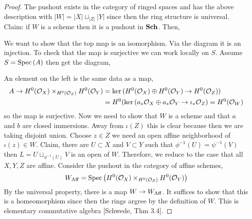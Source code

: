 \documentclass[12pt]{article}
\begin{document}
\newcommand{\RS}{\mathrm{RS}}

\begin{proof}
The pushout exists in the category of ringed spaces and has the above description with $|W| = |X| \sqcup_{|Z|} |Y|$ since then the ring structure is universal. Claim: if $W$ is a scheme then it is a pushout in $\mathbf{Sch}$. Then,
\begin{center}
\end{center}
We want to show that the top map is an isomorphism. Via the diagram it is an injection. To check that the map is surjective we can work locally on $S$. Assume $S = \mathrm{Spec}\left( A \right)$ then get the diagram,
\begin{center}
\end{center}
An element on the left is the same data as a map,
\begin{align*}
A \to H^0(\mathcal{O}_{X}) \times_{H^0(\mathcal{O}_{Z})} H^0(\mathcal{O}_{Y}) & = \ker{(H^0(\mathcal{O}_{X}) \oplus H^0(\mathcal{O}_{Y}) \to H^0(\mathcal{O}_{Z}))} 
\\
& = H^0(\ker{(a_* \mathcal{O}_{X} \oplus a_* \mathcal{O}_{Y} \to \iota_* \mathcal{O}_{Z})} = H^0(\mathcal{O}_{W})
\end{align*}
so the map is surjective. Now we need to show that $W$ is a scheme and that $a$ and $b$ are closed immersions. Away from $\iota(Z)$ this is clear because then we are taking disjoint union. Choose $z \in Z$ we need an open affine neighborhood of $\iota(z) \in W$. Claim, there are $U \subset X$ and $V \subset Y$ such that $\phi^{-1}(U) = \psi^{-1}(V)$ then $L = U \sqcup_{\phi^{-1}(U)} V$ is an open of $W$. Therefore, we reduce to the case that all $X,Y,Z$ are affine. Consider the pushout in the category of affine schemes,
\[ W_{\mathrm{Aff}} = \mathrm{Spec}\left( H^0(\mathcal{O}_{X}) \times_{H^0(\mathcal{O}_{Z})} H^0(\mathcal{O}_{Y}) \right) \]
By the universal property, there is a map $W \to W_{\mathrm{Aff}}$. It suffices to show that this is a homeomorphism since then the rings argree by the definition of $W$. This is elementary commutative algebra [Schwede, Thm 3.4]. 
\end{proof}
\end{document}
